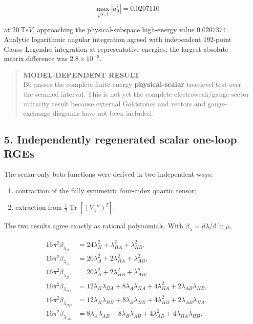 \documentclass[
]{article}
\providecommand{\tightlist}{%
  \setlength{\itemsep}{0pt}\setlength{\parskip}{0pt}}
\begin{document}
\[
\max_{\sqrt s,i}|a_0^i|=0.0207110
\]

at \(20\ {\mathrm TeV}\), approaching the physical-subspace high-energy
value \(0.0207374\). Analytic logarithmic angular integration agreed
with independent 192-point Gauss--Legendre integration at representative
energies; the largest absolute matrix difference was
\(2.8\times10^{-9}\).

\begin{quote}
\textbf{MODEL-DEPENDENT RESULT}\\
B0 passes the complete finite-energy \textbf{physical-scalar} tree-level
test over the scanned interval. This is not yet the complete
electroweak/gauge-sector unitarity result because external Goldstones
and vectors and gauge-exchange diagrams have not been included.
\end{quote}

\hypertarget{independently-regenerated-scalar-one-loop-rges}{%
\subsection{5. Independently regenerated scalar one-loop
RGEs}\label{independently-regenerated-scalar-one-loop-rges}}

The scalar-only beta functions were derived in two independent ways:

\begin{enumerate}
\def\labelenumi{\arabic{enumi}.}
\tightlist
\item
  contraction of the fully symmetric four-index quartic tensor;
\item
  extraction from \(\tfrac12\operatorname{Tr}[(V_4'')^2]\).
\end{enumerate}

The two results agree exactly as rational polynomials. With
\(\beta_\lambda=d\lambda/d\ln\mu\),

\[
\begin{aligned}
16\pi^2\beta_{\lambda_H}&=24\lambda_H^2+\lambda_{HA}^2+\lambda_{HB}^2,\\
16\pi^2\beta_{\lambda_A}&=20\lambda_A^2+2\lambda_{HA}^2+\lambda_{AB}^2,\\
16\pi^2\beta_{\lambda_B}&=20\lambda_B^2+2\lambda_{HB}^2+\lambda_{AB}^2,\\
16\pi^2\beta_{\lambda_{HA}}&=12\lambda_H\lambda_{HA}+8\lambda_A\lambda_{HA}
+4\lambda_{HA}^2+2\lambda_{AB}\lambda_{HB},\\
16\pi^2\beta_{\lambda_{HB}}&=12\lambda_H\lambda_{HB}+8\lambda_B\lambda_{HB}
+4\lambda_{HB}^2+2\lambda_{AB}\lambda_{HA},\\
16\pi^2\beta_{\lambda_{AB}}&=8\lambda_A\lambda_{AB}+8\lambda_B\lambda_{AB}
+4\lambda_{AB}^2+4\lambda_{HA}\lambda_{HB}.
\end{aligned}
\]
\end{document}
